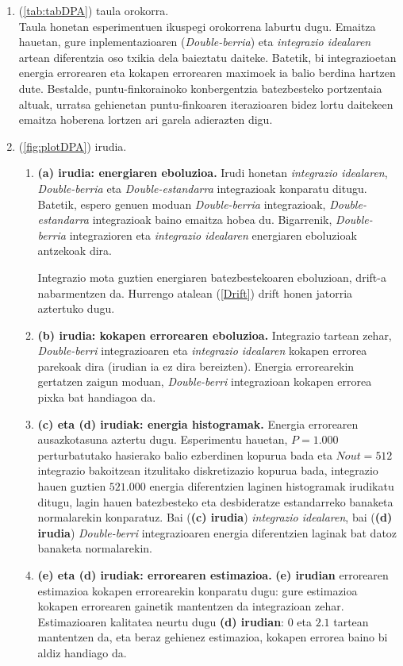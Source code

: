 \begin{enumerate}
\item (\ref{tab:tabDPA}) taula orokorra.\\
Taula honetan esperimentuen ikuspegi orokorrena laburtu dugu. Emaitza hauetan, gure inplementazioaren (\emph{Double-berria}) eta \emph{integrazio idealaren} artean diferentzia oso txikia dela baieztatu daiteke. Batetik,  bi integrazioetan energia errorearen eta kokapen errorearen maximoek ia balio berdina hartzen dute. Bestalde, puntu-finkorainoko konbergentzia batezbesteko portzentaia altuak,  urratsa gehienetan puntu-finkoaren iterazioaren bidez lortu daitekeen emaitza hoberena lortzen ari garela adierazten digu.    

\item (\ref{fig:plotDPA}) irudia.
\begin{enumerate}
\item \textbf{(a) irudia: energiaren eboluzioa.}
Irudi honetan \emph{integrazio idealaren}, \emph{Double-berria} eta \emph{Double-estandarra} integrazioak konparatu ditugu. Batetik, espero genuen moduan \emph{Double-berria} integrazioak, \emph{Double-estandarra} integrazioak baino emaitza hobea du. Bigarrenik, \emph{Double-berria} integrazioren eta \emph{integrazio idealaren} energiaren eboluzioak antzekoak dira.

Integrazio mota guztien energiaren batezbestekoaren eboluzioan, drift-a nabarmentzen da. Hurrengo atalean (\ref{Drift}) drift honen jatorria aztertuko dugu.  

\item \textbf{(b) irudia: kokapen errorearen eboluzioa.}
Integrazio tartean zehar, \emph{Double-berri} integrazioaren eta \emph{integrazio idealaren} kokapen errorea parekoak dira (irudian ia ez dira bereizten). Energia errorearekin gertatzen zaigun moduan, \emph{Double-berri} integrazioan kokapen errorea pixka bat handiagoa da. 

\item \textbf{(c) eta (d) irudiak: energia histogramak.}
Energia errorearen ausazkotasuna aztertu dugu. Esperimentu hauetan, $P=1.000$ perturbatutako hasierako balio ezberdinen kopurua bada eta $Nout=512$ integrazio bakoitzean itzulitako diskretizazio kopurua bada, integrazio hauen guztien $521.000$ energia diferentzien laginen histogramak irudikatu ditugu, lagin hauen batezbesteko eta desbideratze estandarreko banaketa normalarekin konparatuz. Bai (\textbf{(c) irudia}) \emph{integrazio idealaren}, bai (\textbf{(d) irudia}) \emph{Double-berri} integrazioaren energia diferentzien laginak bat datoz banaketa normalarekin. 

\item \textbf{(e) eta (d) irudiak: errorearen estimazioa.}     
\textbf{(e) irudian} errorearen estimazioa kokapen errorearekin konparatu dugu: gure estimazioa kokapen errorearen gainetik mantentzen da integrazioan zehar. Estimazioaren kalitatea neurtu dugu \textbf{(d) irudian}:  $0$ eta $2.1$ tartean mantentzen da, eta beraz gehienez estimazioa, kokapen errorea baino bi aldiz handiago da. 

\end{enumerate}

\end{enumerate}
